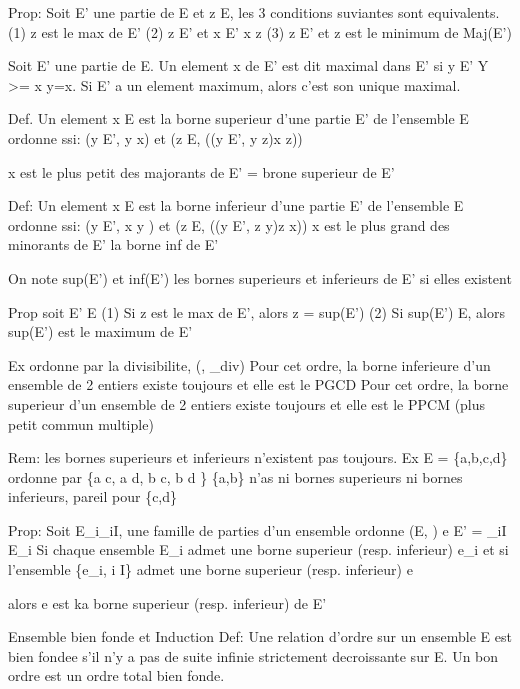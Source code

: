 \documentclass{article}
\begin{document}
Prop: Soit E' une partie de E et z \in E, les 3 conditions suviantes sont equivalents.
(1) z est le max de E'
(2) z \in E' et \forall x \in E' x \leq z
(3) z \in E' et z est le minimum de Maj(E')

Soit E' une partie de E. Un element x de E' est dit maximal dans E' si \forall y \in E' Y >= x \rightarrow y=x. Si E' a un element maximum, alors c'est son unique maximal.

Def. Un element x \in E est la borne superieur d'une partie E' de l'ensemble E ordonne
ssi: (\forall y \in E', y \leq x) et (\forall z \in E, ((\forall y \in E', y \leq z)\rightarrow x \leq z))

x est le plus petit des majorants de E' = brone superieur de E'

Def: Un element x \in E est la borne inferieur d'une partie E' de l'ensemble E ordonne
ssi: (\forall y \in E', x \leq y ) et (\forall z \in E, ((\forall y \in E', z \leq y)\rightarrow z \leq x))
x est le plus grand des minorants de E' la borne inf de E'

On note sup(E') et inf(E') les bornes superieurs et inferieurs de E' si elles existent

Prop soit E' \subseteq E
(1) Si z est le max de E', alors z = sup(E')
(2) Si sup(E') \in E, alors sup(E') est le maximum de E'

Ex \N ordonne par la divisibilite, (\N, \leq_{div})
Pour cet ordre, la borne inferieure d'un ensemble de 2 entiers existe toujours et elle est le PGCD
Pour cet ordre, la borne superieur d'un ensemble de 2 entiers existe toujours et elle est le PPCM (plus petit commun multiple)

Rem: les bornes superieurs et inferieurs n'existent pas toujours.
Ex E = \{a,b,c,d\} ordonne par \{a \leq c, a \leq d, b \leq c, b \leq d \}
\{a,b\} n'as ni bornes superieurs ni bornes inferieurs, pareil pour \{c,d\}

Prop: Soit {E_i}_{i\in I}, une famille de parties d'un ensemble ordonne (E, \leq) e E' = \cup_{i\in I} E_i
Si chaque ensemble E_i admet une borne superieur (resp. inferieur) e_i
et si l'ensemble \{e_i, i \in I\} admet une borne superieur (resp. inferieur) e

alors e est ka borne superieur (resp. inferieur) de E'



Ensemble bien fonde et Induction
Def: Une relation d'ordre \leq sur un ensemble E est bien fondee s'il n'y a pas de suite infinie strictement decroissante sur E.
Un bon ordre est un ordre total bien fonde.
\end{document}
